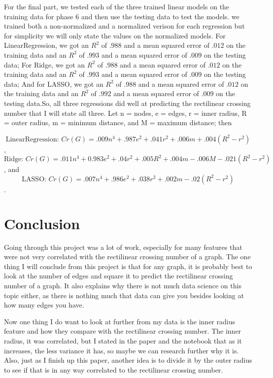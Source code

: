 \documentclass{article}
\begin{document}
For the final part, we tested each of the three trained linear models on the training data for phase 6 and then use the testing data to test the models. we trained both a non-normalized and a normalized verison for each regression but for simplicity we will only state the values on the normalized models. For LinearRegression, we got an $R^2$ of $.988$ and a mean squared error of $.012$ on the training data and an $R^2$ of $.993$ and a mean squared error of $.009$ on the testing data; For Ridge, we got an $R^2$ of $.988$ and a mean squared error of $.012$ on the training data and an $R^2$ of $.993$ and a mean squared error of $.009$ on the testing data; And for LASSO, we got an $R^2$ of $.988$ and a mean squared error of $.012$ on the training data and an $R^2$ of $.992$ and a mean squared error of $.009$ on the testing data.So, all three regressions did well at predicting the rectilinear crossing number that I will state all three. Let n = nodes, e = edges, r = inner radius, R = outer radius, m = minimum distance, and M = maximum distance; then

\[\text{LinearRegression: } Cr(G) = .009n^4 + .987e^2 + .041r^2 + .006m + .004(R^2 - r^2)\],
\[\text{Ridge: } Cr(G) = .011n^4 + 0.983e^2 + .04r^2 + .005R^2 + .004m - .006M - .021(R^2 - r^2)\], and
\[\text{LASSO: } Cr(G) = .007n^4 + .986e^2 + .038r^2 + .002m - .02(R^2 - r^2)\].


\section*{Conclusion}
Going through this project was a lot of work, especially for many features that were not very correlated with the rectilinear crossing number of a graph. The one thing I will conclude from this project is that for any graph, it is probably best to look at the number of edges and square it to predict the rectilinear crossing number of a graph. It also explains why there is not much data science on this topic either, as there is nothing much that data can give you besides looking at how many edges you have.

Now one thing I do want to look at further from my data is the inner radius feature and how they compare with the rectilinear crossing number. The inner radius, it was correlated, but I stated in the paper and the notebook that as it increases, the less variance it has, so maybe we can research further why it is. Also, just as I finish up this paper, another idea is to divide it by the outer radius to see if that is in any way correlated to the rectilinear crossing number.
\end{document}
